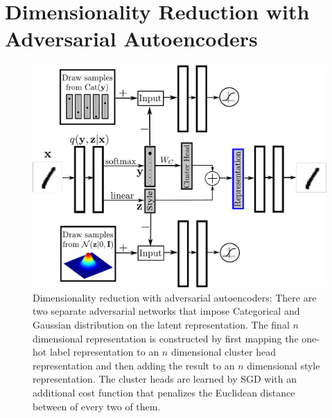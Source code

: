\documentclass{article}
\begin{document}
\section{Dimensionality Reduction with Adversarial Autoencoders}\label{dim_reduce}

\begin{figure}[!b]
\begin{center}
\centering 
\includegraphics[scale=.4]{dim_reduce}
\caption{\label{fig_2d}Dimensionality reduction with adversarial autoencoders: There are two separate adversarial networks that impose Categorical and Gaussian distribution on the latent representation. The final $n$ dimensional representation is constructed by first mapping the one-hot label representation to an $n$ dimensional cluster head representation and then adding the result to an $n$ dimensional style representation. The cluster heads are learned by SGD with an additional cost function that penalizes the Euclidean distance between of every two of them.}
\end{center}
\end{figure}
\end{document}
